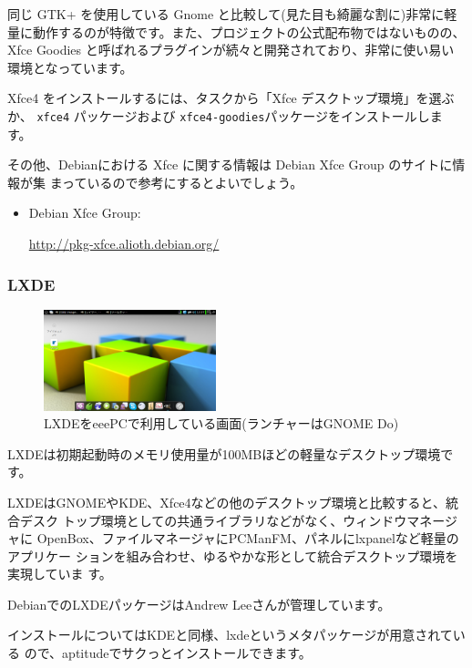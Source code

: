 \documentclass[mingoth,a4paper]{jsarticle}
\begin{document}
同じ GTK+ を使用している Gnome と比較して(見た目も綺麗な割に)非常に軽量に動作するのが特徴です。また、プロジェクトの公式配布物ではないものの、Xfce Goodies と呼ばれるプラグインが続々と開発されており、非常に使い易い環境となっています。


Xfce4 をインストールするには、タスクから「Xfce デスクトップ環境」を選ぶか、
{\tt xfce4} パッケージおよび {\tt xfce4-goodies}パッケージをインストールします。


その他、Debianにおける Xfce に関する情報は Debian Xfce Group のサイトに情報が集
まっているので参考にするとよいでしょう。

\begin{itemize}
 \item Debian Xfce Group:

       \url{http://pkg-xfce.alioth.debian.org/}

\end{itemize}



\subsubsection{LXDE}
\begin{figure}
 \begin{center}
  \includegraphics[width=5cm]{image201004/lxde-eeepc.png}
  \caption{LXDEをeeePCで利用している画面(ランチャーはGNOME Do)}
 \end{center}
\end{figure}

LXDEは初期起動時のメモリ使用量が100MBほどの軽量なデスクトップ環境です。

LXDEはGNOMEやKDE、Xfce4などの他のデスクトップ環境と比較すると、統合デスク
トップ環境としての共通ライブラリなどがなく、ウィンドウマネージャに
OpenBox、ファイルマネージャにPCManFM、パネルにlxpanelなど軽量のアプリケー
ションを組み合わせ、ゆるやかな形として統合デスクトップ環境を実現していま
す。

DebianでのLXDEパッケージはAndrew Leeさんが管理しています。

インストールについてはKDEと同様、lxdeというメタパッケージが用意されている
ので、aptitudeでサクっとインストールできます。
\\
\end{document}
